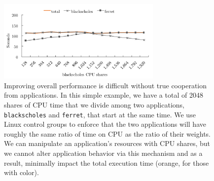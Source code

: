 \begin{figure}[t!]
    \centering
    \includegraphics[width=8cm,height=4cm]{fig/without-application.pdf}
    \caption{Improving overall performance is difficult without true cooperation from applications.  In this simple example, we have a total of 2048 shares of CPU time that we divide among two applications, \texttt{blackscholes} and \texttt{ferret}, that start at the same time. We use Linux control groups to enforce that the two applications will have roughly the same ratio of time on CPU as the ratio of their weights. We can manipulate an application's resources with CPU shares, but we cannot alter application behavior via this mechanism and as a result, minimally impact the total execution time (orange, for those with color).}
    \label{fig:naive-cooperation}
\end{figure}